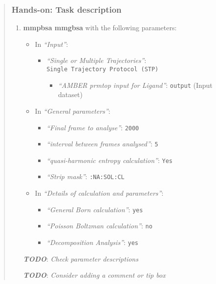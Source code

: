 \documentclass[twocolumn]{bmcart}%
\providecommand{\tightlist}{%
  \setlength{\itemsep}{0pt}\setlength{\parskip}{0pt}}
\providecommand{\tightlist}{%
  \setlength{\itemsep}{0pt}\setlength{\parskip}{0pt}}
\begin{document}
\begin{quote}
\hypertarget{hands-on-task-description-18}{%
\subsubsection{Hands-on: Task
description}\label{hands-on-task-description-18}}

\begin{enumerate}
\def\labelenumi{\arabic{enumi}.}
\tightlist
\item
  \textbf{mmpbsa mmgbsa} with the following parameters:

  \begin{itemize}
  \tightlist
  \item
    In \emph{``Input''}:

    \begin{itemize}
    \tightlist
    \item
      \emph{``Single or Multiple Trajectories''}:
      \texttt{Single\ Trajectory\ Protocol\ (STP)}

      \begin{itemize}
      \tightlist
      \item
        \emph{``AMBER prmtop input for Ligand''}: \texttt{output} (Input
        dataset)
      \end{itemize}
    \end{itemize}
  \item
    In \emph{``General parameters''}:

    \begin{itemize}
    \tightlist
    \item
      \emph{``Final frame to analyse''}: \texttt{2000}
    \item
      \emph{``interval between frames analysed''}: \texttt{5}
    \item
      \emph{``quasi-harmonic entropy calculation''}: \texttt{Yes}
    \item
      \emph{``Strip mask''}: \texttt{:NA:SOL:CL}
    \end{itemize}
  \item
    In \emph{``Details of calculation and parameters''}:

    \begin{itemize}
    \tightlist
    \item
      \emph{``General Born calculation''}: \texttt{yes}
    \item
      \emph{``Poisson Boltzman calculation''}: \texttt{no}
    \item
      \emph{``Decomposition Analysis''}: \texttt{yes}
    \end{itemize}
  \end{itemize}

  \textbf{\emph{TODO}}: \emph{Check parameter descriptions}

  \textbf{\emph{TODO}}: \emph{Consider adding a comment or tip box}
\end{enumerate}


\end{quote}
\end{document}
